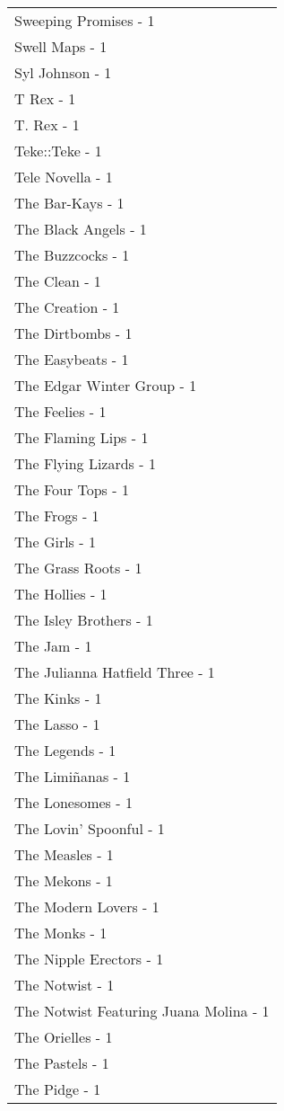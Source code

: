 \documentclass[
]{article}
\begin{document}
\begin{longtable}{l}
Sweeping Promises - 1 \\ 
Swell Maps - 1 \\ 
Syl Johnson - 1 \\ 
T Rex - 1 \\ 
T. Rex - 1 \\ 
Teke::Teke - 1 \\ 
Tele Novella - 1 \\ 
The Bar-Kays - 1 \\ 
The Black Angels - 1 \\ 
The Buzzcocks - 1 \\ 
The Clean - 1 \\ 
The Creation - 1 \\ 
The Dirtbombs - 1 \\ 
The Easybeats - 1 \\ 
The Edgar Winter Group - 1 \\ 
The Feelies - 1 \\ 
The Flaming Lips - 1 \\ 
The Flying Lizards - 1 \\ 
The Four Tops - 1 \\ 
The Frogs - 1 \\ 
The Girls - 1 \\ 
The Grass Roots - 1 \\ 
The Hollies - 1 \\ 
The Isley Brothers - 1 \\ 
The Jam - 1 \\ 
The Julianna Hatfield Three - 1 \\ 
The Kinks - 1 \\ 
The Lasso - 1 \\ 
The Legends - 1 \\ 
The Limiñanas - 1 \\ 
The Lonesomes - 1 \\ 
The Lovin' Spoonful - 1 \\ 
The Measles - 1 \\ 
The Mekons - 1 \\ 
The Modern Lovers - 1 \\ 
The Monks - 1 \\ 
The Nipple Erectors - 1 \\ 
The Notwist - 1 \\ 
The Notwist Featuring Juana Molina - 1 \\ 
The Orielles - 1 \\ 
The Pastels - 1 \\ 
The Pidge - 1 \\ 

\end{longtable}
\end{document}
